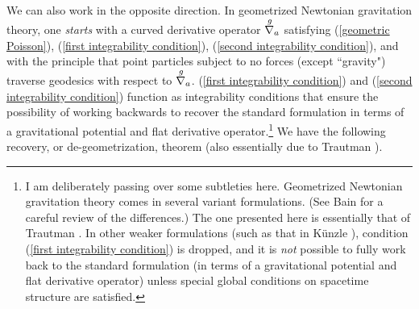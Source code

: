 \documentclass [12] {article}
\theoremstyle{plain}
\numberwithin{figure}{subsection}
\numberwithin{proposition}{subsection}
\begin{document}

We can also work in the  opposite direction.  In geometrized Newtonian gravitation theory,  one  \emph{starts} with a curved derivative operator  $\stackrel{g \hspace{.4em}}{\nabla_a}$ satisfying (\ref{geometric Poisson}), (\ref{first integrability condition}), (\ref{second integrability condition}), and with the principle that point particles subject to no forces (except ``gravity") traverse geodesics with respect to  $\stackrel{g \hspace{.4em}}{\nabla_a}$.   (\ref{first integrability condition}) and (\ref{second integrability condition}) function  as integrability conditions that ensure the possibility of working backwards to recover the standard formulation in terms of a gravitational potential and flat derivative operator.\footnote{I am deliberately passing over some subtleties here. Geometrized Newtonian gravitation theory comes in several variant formulations.   (See Bain  for a careful review of the differences.)   The one presented here is essentially that of Trautman  .  In other weaker formulations (such as that in K\"unzle ),  condition (\ref{first integrability condition}) is dropped, and it is \emph{not} possible to fully work back to the standard formulation (in terms of a gravitational potential and flat derivative operator) unless special global conditions on spacetime structure are satisfied. %
} We have the following recovery, or de-geometrization,  theorem (also essentially due to Trautman ).

\end{document}
